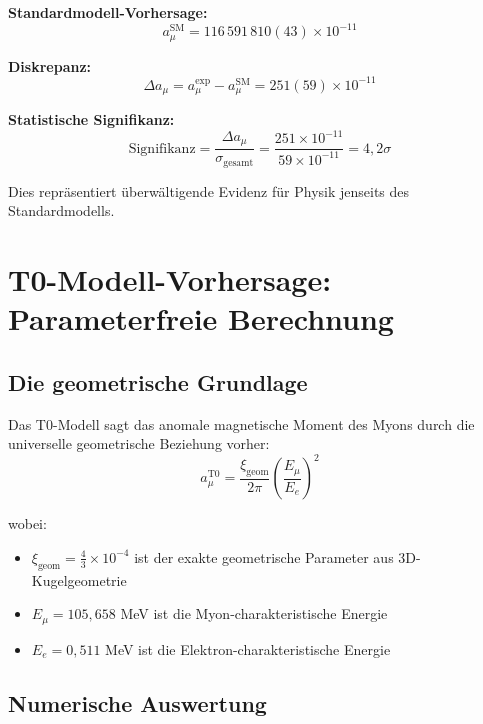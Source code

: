 \documentclass[12pt,a4paper]{report}
\newcommand{\xigeom}{\xi_{\text{geom}}}   %
\newcommand{\Ee}{E_e}                     %
\newcommand{\Emu}{E_\mu}                  %
\begin{document}
\textbf{Standardmodell-Vorhersage:}
\begin{equation}
	a_\mu^{\text{SM}} = 116\,591\,810(43) \times 10^{-11}
	\label{eq:sm_prediction}
\end{equation}

\textbf{Diskrepanz:}
\begin{equation}
	\Delta a_\mu = a_\mu^{\text{exp}} - a_\mu^{\text{SM}} = 251(59) \times 10^{-11}
	\label{eq:discrepancy}
\end{equation}

\textbf{Statistische Signifikanz:}
\begin{equation}
	\text{Signifikanz} = \frac{\Delta a_\mu}{\sigma_{\text{gesamt}}} = \frac{251 \times 10^{-11}}{59 \times 10^{-11}} = 4,2\sigma
	\label{eq:significance}
\end{equation}

Dies repräsentiert überwältigende Evidenz für Physik jenseits des Standardmodells.

\section{T0-Modell-Vorhersage: Parameterfreie Berechnung}
\label{sec:t0_prediction}

\subsection{Die geometrische Grundlage}
\label{subsec:geometric_foundation}

Das T0-Modell sagt das anomale magnetische Moment des Myons durch die universelle geometrische Beziehung vorher:
\begin{equation}
	a_\mu^{\text{T0}} = \frac{\xigeom}{2\pi} \left(\frac{\Emu}{\Ee}\right)^2
	\label{eq:t0_prediction}
\end{equation}

wobei:
\begin{itemize}
	\item $\xigeom = \frac{4}{3} \times 10^{-4}$ ist der exakte geometrische Parameter aus 3D-Kugelgeometrie
	\item $\Emu = 105,658$ MeV ist die Myon-charakteristische Energie
	\item $\Ee = 0,511$ MeV ist die Elektron-charakteristische Energie
\end{itemize}

\subsection{Numerische Auswertung}
\label{subsec:numerical_evaluation}
\end{document}
